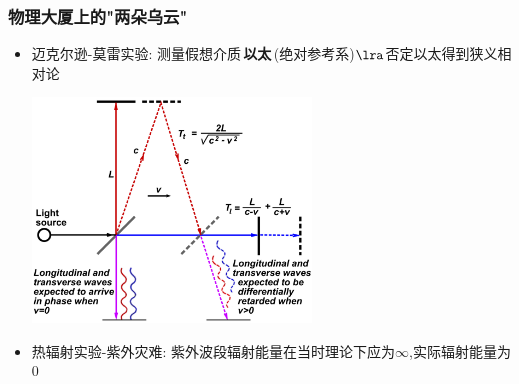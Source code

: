 \documentclass{article}
\begin{document}
\subsubsection{物理大厦上的"两朵乌云"}
\begin{itemize}
    \item 迈克尔逊-莫雷实验: 测量假想介质\,\textbf{以太}\,(绝对参考系)$\lra$否定以太得到狭义相对论

          \vspace{1em}

          \includegraphics[width=20em,keepaspectratio]{./pictures/4.png}

          \vspace{1em}

    \item 热辐射实验-紫外灾难: 紫外波段辐射能量在当时理论下应为$\infty$,实际辐射能量为$0$
\end{itemize}

\vspace{2em}
\end{document}
